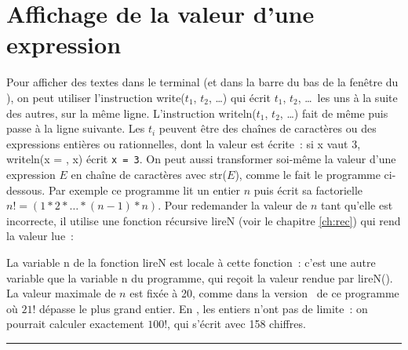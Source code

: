 \section{Affichage de la valeur d'une expression}
Pour afficher des textes dans le terminal (et dans la barre du bas de la fenêtre du
\robot), on
peut utiliser l'instruction {\idt write(}$t_1${\idt ,} $t_2${\idt ,} \ldots{\idt )} qui écrit 
$t_1$, $t_2$, \ldots\ les uns
à la suite des autres, sur la même ligne. L'instruction
{\idt writeln(}$t_1${\idt ,} $t_2${\idt ,} \ldots{\idt )} fait de même puis passe à la ligne suivante.
Les $t_i$ peuvent être des chaînes de caractères ou des expressions entières ou rationnelles,
dont la valeur est écrite~: si {\idt x} vaut 3, {\idt writeln(}{\cha {}x = }{\idt , x)}
écrit {\tt x = 3}. On peut aussi transformer soi-même la valeur d'une expression $E$ en chaîne de caractères
avec {\idt str(}$E${\idt )}, comme le fait le programme ci-dessous. Par exemple
ce programme lit
un entier $n$
puis écrit sa factorielle $n! = (1 \ast 2 \ast \ldots \ast (n - 1) \ast n)$. Pour redemander
la valeur de $n$ tant qu'elle est incorrecte, il utilise une fonction récursive {\idt lireN}
(voir le chapitre \ref{ch:rec}) qui rend la valeur lue~:


\noindent La variable {\idt n} de la fonction {\idt lireN} est locale à cette fonction~: c'est
une autre variable que la variable {\idt n} du programme, qui reçoit la valeur rendue par
{\idt lireN()}. La valeur maximale de $n$ est fixée à 20, comme dans la version \ocaml\ de
ce programme où $21!$ dépasse le plus grand entier. En \python, les entiers n'ont pas de limite~:
on pourrait calculer exactement $100!$, qui s'écrit avec 158 chiffres.
\vfill

\noindent \rule{137mm}{0.1mm} %

